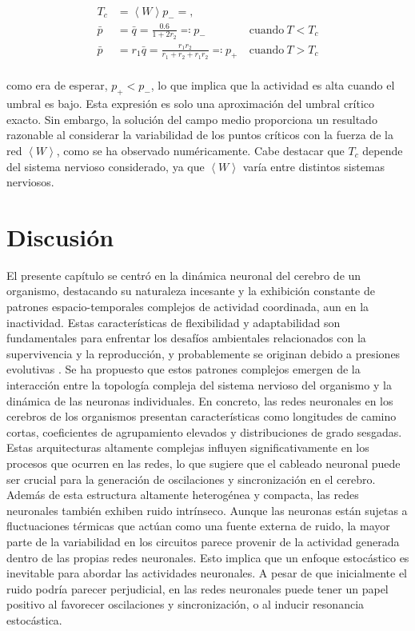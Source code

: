 \begin{equation}\label{eq:78}
	\begin{aligned}
		T_c &= \left\langle W\right\rangle p_{-} = ,	\\
		\bar{p}&=\bar{q}=\frac{0.6}{1+2r_2} \eqqcolon p_{-} &\ \text{cuando} \ T<T_c \\
		\bar{p} &= r_1\bar{q} = \frac{r_1r_2}{r_1+r_2+r_1r_2}\eqqcolon p_{+} &\ \text{cuando} \ T>T_c\\
		\end{aligned}
\end{equation}

como era de esperar, $p_{+} < p_{-}$, lo que implica que la actividad es alta cuando el umbral es bajo. Esta expresión es solo una aproximación del umbral crítico exacto. Sin embargo, la solución del campo medio proporciona un resultado razonable al considerar la variabilidad de los puntos críticos con la fuerza de la red  $\left\langle W \right\rangle$, como se ha observado numéricamente. Cabe destacar que $T_c$ depende del sistema nervioso considerado, ya que  $\left\langle W \right\rangle$ varía entre distintos sistemas nerviosos.


\section{Discusión}
	
El presente capítulo se centró en la dinámica neuronal del cerebro de un organismo, destacando su naturaleza incesante y la exhibición constante de patrones espacio-temporales complejos de actividad coordinada, aun en la inactividad. Estas características de flexibilidad y adaptabilidad son fundamentales para enfrentar los desafíos ambientales relacionados con la supervivencia y la reproducción, y probablemente se originan debido a presiones evolutivas \cite{haimovici_dynamical_2016}. Se ha propuesto que estos patrones complejos emergen de la interacción entre la topología compleja del sistema nervioso del organismo y la dinámica de las neuronas individuales. En concreto, las redes neuronales en los cerebros de los organismos presentan características como longitudes de camino cortas, coeficientes de agrupamiento elevados y distribuciones de grado sesgadas. Estas arquitecturas altamente complejas influyen significativamente en los procesos que ocurren en las redes, lo que sugiere que el cableado neuronal puede ser crucial para la generación de oscilaciones y sincronización en el cerebro. Además de esta estructura altamente heterogénea y compacta, las redes neuronales también exhiben ruido intrínseco. Aunque las neuronas están sujetas a fluctuaciones térmicas que actúan como una fuente externa de ruido, la mayor parte de la variabilidad en los circuitos parece provenir de la actividad generada dentro de las propias redes neuronales. Esto implica que un enfoque estocástico es inevitable para abordar las actividades neuronales. A pesar de que inicialmente el ruido podría parecer perjudicial, en las redes neuronales puede tener un papel positivo al favorecer oscilaciones y sincronización, o al inducir resonancia estocástica.


